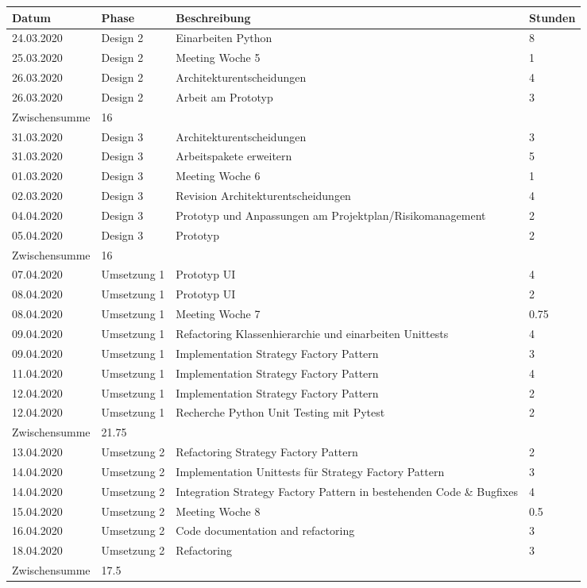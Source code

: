 \documentclass[
	ngerman,
	toc=listof, %
	toc=bibliography, %
	footnotes=multiple, %
	parskip=half, %
	numbers=noendperiod %
]{scrartcl}
\begin{document}
	\newpage

	\begin{tabularx}{\textwidth}{llXl}
		\toprule
		Datum & Phase & Beschreibung & Stunden \\
		\midrule
		24.03.2020 & Design 2 & Einarbeiten Python & 8 \\
		25.03.2020 & Design 2 & Meeting Woche 5 & 1 \\
		26.03.2020 & Design 2 & Architekturentscheidungen & 4 \\
		26.03.2020 & Design 2 & Arbeit am Prototyp & 3 \\
		\midrule
		Zwischensumme & 16 & & \\
		\midrule
		31.03.2020 & Design 3 & Architekturentscheidungen & 3 \\
		31.03.2020 & Design 3 & Arbeitspakete erweitern &  5 \\
		01.03.2020 & Design 3 & Meeting Woche 6 & 1 \\
		02.03.2020 & Design 3 & Revision Architekturentscheidungen & 4 \\
		04.04.2020 & Design 3 & Prototyp und Anpassungen am Projektplan/Risikomanagement & 2 \\ 
		05.04.2020 & Design 3 & Prototyp & 2 \\
		\midrule
		Zwischensumme & 16 & & \\
		\midrule
		07.04.2020 & Umsetzung 1 & Prototyp UI & 4 \\
		08.04.2020 & Umsetzung 1 & Prototyp UI & 2 \\
		08.04.2020 & Umsetzung 1 & Meeting Woche 7 & 0.75 \\
		09.04.2020 & Umsetzung 1 & Refactoring Klassenhierarchie und einarbeiten Unittests & 4 \\
		09.04.2020 & Umsetzung 1 & Implementation Strategy Factory Pattern & 3 \\
		11.04.2020 & Umsetzung 1 & Implementation Strategy Factory Pattern & 4 \\
		12.04.2020 & Umsetzung 1 & Implementation Strategy Factory Pattern & 2 \\
		12.04.2020 & Umsetzung 1 & Recherche Python Unit Testing mit Pytest & 2 \\
		\midrule
		Zwischensumme & 21.75 & & \\
		\midrule
		13.04.2020 & Umsetzung 2 & Refactoring Strategy Factory Pattern & 2 \\
		14.04.2020 & Umsetzung 2 & Implementation Unittests für Strategy Factory Pattern & 3 \\
		14.04.2020 & Umsetzung 2 & Integration Strategy Factory Pattern in bestehenden Code \& Bugfixes & 4 \\
		15.04.2020 & Umsetzung 2 & Meeting Woche 8 & 0.5 \\
		16.04.2020 & Umsetzung 2 & Code documentation and refactoring & 3 \\
		18.04.2020 & Umsetzung 2 & Refactoring & 3 \\
		\midrule
		Zwischensumme & 17.5 & & \\
		\bottomrule
	\end{tabularx}
	
\end{document}
